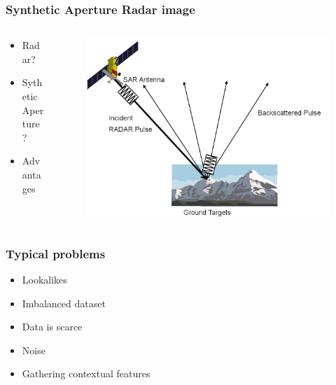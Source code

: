 \documentclass{beamer}
\begin{document}
\begin{frame}
\frametitle{Synthetic Aperture Radar image}

	\begin{columns}[T]
    	\begin{column}{.4\textwidth}

			\begin{itemize}
				\item Radar?
				\item Sythetic Aperture?
				\item Advantages

			\end{itemize}
		\end{column}
		\begin{column}{.6\textwidth}
			\begin{figure}
				\centering
   				\includegraphics[width=\textwidth]{./img/SARexplained.png}
			\end{figure}
		\end{column}
	\end{columns}

\end{frame}


\begin{frame}
\frametitle{Typical problems}

	\begin{itemize}
		\item Lookalikes
		\item Imbalanced dataset
		\item Data is scarce
		\item Noise
		\item Gathering contextual features
	\end{itemize}
	
\end{frame}
\end{document}
